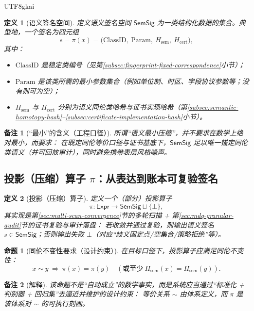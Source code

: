 \documentclass[12pt]{article}
\newtheorem{definition}{定义}[section]
\newtheorem{proposition}{命题}[section]
\newtheorem{remark}{备注}[section]
\begin{document}
\begin{CJK*}{UTF8}{gkai}
\begin{definition}[语义签名空间]
定义语义签名空间 $\mathsf{SemSig}$ 为一类结构化数据的集合。典型地，一个签名为四元组
\[
s=\pi(x)=\bigl(\mathrm{ClassID},\ \mathrm{Param},\ H_{\mathrm{sem}},\ H_{\mathrm{cert}}\bigr),
\]
其中：
\begin{itemize}
  \item $\mathrm{ClassID}$ 是稳定类编号（见第\ref{subsec:fingerprint-fixed-correspondence}小节）；
  \item $\mathrm{Param}$ 是该类所需的最小参数集合（例如单位制、时区、字段协议参数等；没有则可为空）；
  \item $H_{\mathrm{sem}}$ 与 $H_{\mathrm{cert}}$ 分别为语义同伦类哈希与证书实现哈希（第\ref{subsec:semantic-homotopy-hash}--\ref{subsec:certificate-implementation-hash}小节）。
\end{itemize}
\end{definition}

\begin{remark}[“最小”的含义（工程口径）]
所谓“语义最小压缩”，并不要求在数学上绝对最小，而要求：
\emph{在既定同伦等价口径与证书基底下，$\mathsf{SemSig}$ 足以唯一锚定同伦类语义（并可回放审计），同时避免携带表层风格噪声。}
\end{remark}

\subsection{投影（压缩）算子 \texorpdfstring{$\pi$}{pi}：从表达到账本可复验签名}
\label{subsec:projection-pi}

\begin{definition}[投影（压缩）算子]
定义一个（部分）投影算子
\[
\pi:\mathsf{Expr}\to \mathsf{SemSig}\sqcup\{\bot\},
\]
其实现是第\ref{sec:multi-scan-convergence}节的多轮扫描 + 第\ref{sec:mdq-granular-audit}节的证书复验与审计落盘：
若收敛并通过复验，则输出语义签名 $s\in\mathsf{SemSig}$；否则输出失败 $\bot$（对应“歧义固定点/空集合/策略拒绝”等）。
\end{definition}

\begin{proposition}[同伦不变性要求（设计约束）]
在目标口径下，投影算子应满足同伦不变性：
\[
x\sim y\ \Longrightarrow\ \pi(x)=\pi(y)
\quad(\text{或至少}\ H_{\mathrm{sem}}(x)=H_{\mathrm{sem}}(y)).
\]
\end{proposition}

\begin{remark}[解释]
该命题不是“自动成立”的数学事实，而是系统应当通过“标准化 + 判别器 + 回归集”去逼近并维护的设计约束：
等价关系 $\sim$ 由体系定义，而 $\pi$ 是该体系对 $\sim$ 的可执行刻画。
\end{remark}


\end{CJK*}
\end{document}
